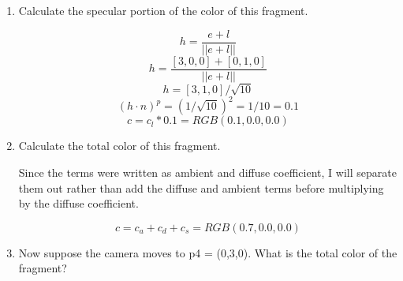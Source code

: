 \documentclass{article}
\begin{document}
\begin{enumerate}
\begin{enumerate}
                \item Calculate the specular portion of the color of this fragment.
                    \begin{mdframed}
                        
                        \begin{displaymath}
                            h = \frac{e + l}{||e + l||}
                        \end{displaymath}
                        \begin{displaymath}
                            h =\frac{[3, 0, 0] + [0, 1, 0]}{||e + l||}
                        \end{displaymath}
                        \begin{displaymath}
                            h = [3, 1, 0]/\sqrt{10}
                        \end{displaymath}
                        \begin{displaymath}
                            (h \cdot n)^p = (1/\sqrt{10})^2 = 1/10 = 0.1
                        \end{displaymath}
                        \begin{displaymath}
                            c = c_l * 0.1 = RGB(0.1, 0.0, 0.0)
                        \end{displaymath}
                    \end{mdframed}

                \item Calculate the total color of this fragment.
                    \begin{mdframed}
                        Since the terms were written as ambient and diffuse
                        coefficient, I will separate them out rather than add
                        the diffuse and ambient terms before multiplying by the
                        diffuse coefficient.

                        \begin{displaymath}
                            c = c_a + c_d + c_s = RGB(0.7, 0.0, 0.0)
                        \end{displaymath}
                    \end{mdframed}

                \item Now suppose the camera moves to p4 = (0,3,0). What is the total color of the
                    fragment?


\end{enumerate}
\end{enumerate}
\end{document}
